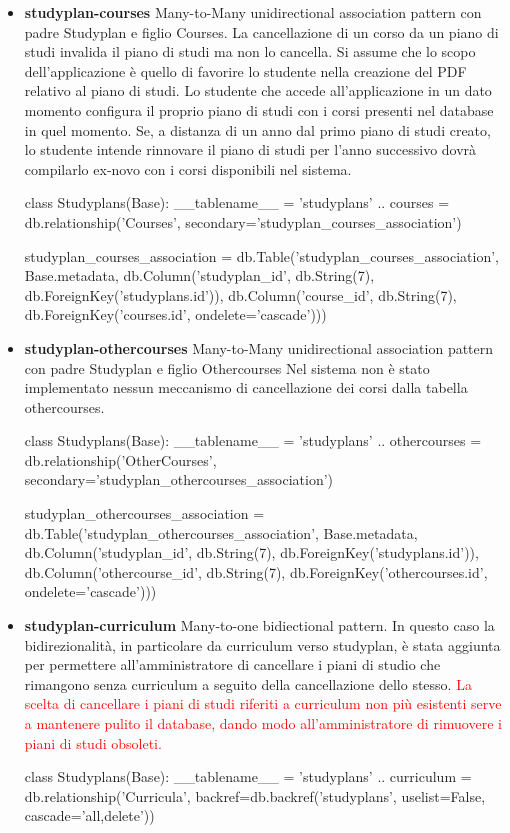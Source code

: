 \documentclass{article}
\begin{document}
\begin{itemize}
\item \textbf{studyplan-courses}  Many-to-Many unidirectional association pattern con padre  Studyplan e figlio Courses.
La cancellazione di un corso da un piano di studi invalida il piano di studi ma non lo cancella. Si assume che lo scopo dell'applicazione è quello di favorire lo studente nella creazione del PDF relativo al piano di studi. Lo studente che accede all'applicazione in un dato momento configura il proprio piano di studi con i corsi  presenti nel database in quel momento. Se, a distanza di un anno dal primo piano di studi creato, lo studente  intende rinnovare il piano di studi per l'anno successivo dovrà compilarlo ex-novo con i corsi disponibili nel sistema. 
\begin{python}
class Studyplans(Base):
    __tablename__ = 'studyplans'
	..
    courses = db.relationship('Courses', secondary='studyplan_courses_association')
    
studyplan_courses_association = db.Table('studyplan_courses_association', Base.metadata,
    db.Column('studyplan_id', db.String(7), db.ForeignKey('studyplans.id')),
    db.Column('course_id', db.String(7), db.ForeignKey('courses.id',  ondelete='cascade')))
\end{python}


\item \textbf{studyplan-othercourses} Many-to-Many unidirectional association pattern con padre  Studyplan e figlio Othercourses
Nel sistema non è stato implementato nessun meccanismo di cancellazione dei corsi dalla tabella othercourses. 
\begin{python}
class Studyplans(Base):
    __tablename__ = 'studyplans'
	..
    othercourses = db.relationship('OtherCourses', secondary='studyplan_othercourses_association')

studyplan_othercourses_association = db.Table('studyplan_othercourses_association', Base.metadata,
    db.Column('studyplan_id', db.String(7), db.ForeignKey('studyplans.id')),
    db.Column('othercourse_id', db.String(7), db.ForeignKey('othercourses.id',  ondelete='cascade')))
\end{python}

\item \textbf{studyplan-curriculum} Many-to-one bidiectional pattern.
In questo caso la bidirezionalità, in particolare da curriculum verso studyplan, è stata aggiunta per permettere all'amministratore di cancellare i piani di studio che rimangono senza curriculum a seguito della cancellazione dello stesso. 
\textcolor{red}{La scelta di cancellare i piani di studi riferiti a curriculum non più esistenti serve a mantenere pulito il database, dando modo all'amministratore di rimuovere i piani di studi obsoleti.}
\begin{python}
class Studyplans(Base):
    __tablename__ = 'studyplans'
	..
    curriculum = db.relationship('Curricula', backref=db.backref('studyplans', uselist=False,  cascade='all,delete'))
\end{python}


\end{itemize}
\end{document}
